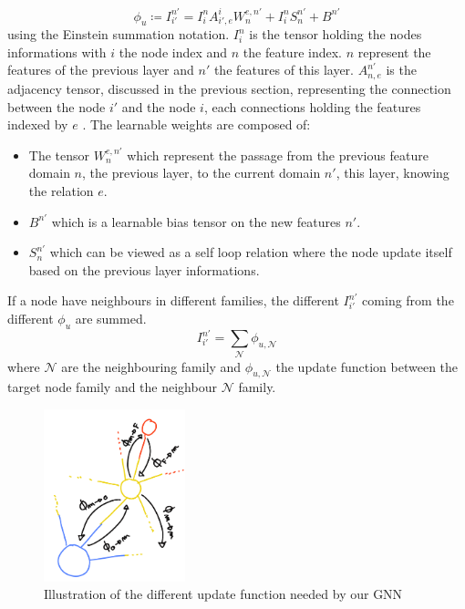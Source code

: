 \documentclass[../main.tex]{subfiles}
\begin{document}
\begin{equation}
  \phi_u \coloneq I^{n'}_{i'} = I^n_i A_{i',e}^{i} W_n^{e,n'} + I^n_i S^{n'}_{n} + B^{n'}
\end{equation}
using the Einstein summation notation. $I^{n}_i$ is the tensor holding the nodes informations with $i$ the node index and $n$ the feature index. $n$ represent the features of the previous layer and $n'$ the features of this layer. $A_{n,e}^{n'}$ is the adjacency tensor, discussed in the previous section, representing the connection between the node $i'$ and the node $i$, each connections holding the features indexed by $e$ . The learnable weights are composed of:
\begin{itemize}
  \item The tensor $W_n^{e,n'}$ which represent the passage from the previous feature domain $n$, the previous layer, to the current domain $n'$, this layer, knowing the relation $e$.
  \item $B^{n'}$ which is a learnable bias tensor on the new features $n'$.
  \item $S^{n'}_n$ which can be viewed as a self loop relation where the node update itself based on the previous layer informations.
\end{itemize}
If a node have neighbours in different families, the different $I^{n'}_{i'}$ coming from the different $\phi_u$ are summed.
\begin{equation}
  I^{n'}_{i'} = \sum_\mathcal{N} \phi_{u,\mathcal{N}}
\end{equation}
where $\mathcal{N}$ are the neighbouring family and $\phi_{u,\mathcal{N}}$ the update function between the target node family and the neighbour $\mathcal{N}$ family.

\begin{figure}
  \centering
  \includegraphics[height=5cm]{images/jgnn/mp_illus.png}
  \caption{Illustration of the different update function needed by our GNN}
  \label{fig:jgnn:mp_ill}
\end{figure}
\end{document}
